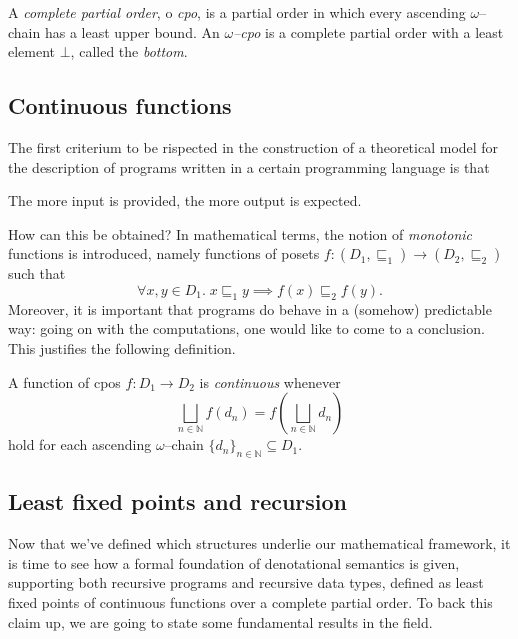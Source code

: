 \begin{dfn}
  A \emph{complete partial order}, o \emph{cpo}, is a partial order in which every ascending \(\omega\)--chain has a least upper bound.
  An \emph{\(\omega\)--cpo} is a complete partial order with a least element
  \(\bot\), called the \emph{bottom}.
\end{dfn}

\subsection[Continuous functions]{Continuous functions}

The first criterium to be rispected in the construction of a theoretical model for the description of programs written in a certain programming language is that
\begin{displayquote}
  The more input is provided, the more output is expected.
\end{displayquote}
How can this be obtained? In mathematical terms, the notion of \emph{monotonic} functions is introduced, namely functions of posets%
\(f \colon (D_1,{}\sqsubseteq_1) \to (D_2,{}\sqsubseteq_2)\) such that
\begin{equation*}
  \forall{}x,y \in D_1.\; x \sqsubseteq_1 y \implies f(x) \sqsubseteq_2 f(y).
\end{equation*}
Moreover, it is important that programs do behave in a (somehow) predictable way: going on with the computations, one would like to come to a conclusion.
This justifies the following definition.

\begin{dfn}
  A function of cpos \(f \colon D_1 \to D_2\) is \emph{continuous} whenever
  \begin{equation*}
    \bigsqcup_{n \in \mathbb{N}} f(d_n) = f\left(\bigsqcup_{n\in\mathbb{N}}d_n\right)
  \end{equation*}
  hold for each ascending \(\omega\)--chain \(\lbrace d_n \rbrace_{n \in \mathbb{N}} \subseteq D_1\).
\end{dfn}

\subsection[Fixed points]{Least fixed points and recursion}

Now that we've defined which structures underlie our mathematical framework, it is time to see how a formal foundation of denotational semantics is given, supporting both recursive programs and recursive data types, defined as least
fixed points of continuous functions over a complete partial order.
To back this claim up, we are going to state some fundamental results in the field.

